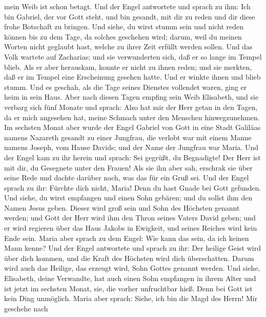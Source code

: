 mein Weib ist schon betagt.  Und der Engel antwortete und
sprach zu ihm: Ich bin Gabriel, der vor Gott steht, und bin gesandt, mit
dir zu reden und dir diese frohe Botschaft zu bringen. 
Und siehe, du wirst stumm sein und nicht reden können bis zu dem Tage,
da solches geschehen wird; darum, weil du meinen Worten nicht geglaubt
hast, welche zu ihrer Zeit erfüllt werden sollen.  Und
das Volk wartete auf Zacharias; und sie verwunderten sich, daß er so
lange im Tempel blieb.  Als er aber herauskam, konnte er
nicht zu ihnen reden; und sie merkten, daß er im Tempel eine Erscheinung
gesehen hatte. Und er winkte ihnen und blieb stumm.  Und
es geschah, als die Tage seines Dienstes vollendet waren, ging er heim
in sein Haus.  Aber nach diesen Tagen empfing sein Weib
Elisabeth, und sie verbarg sich fünf Monate und sprach: 
Also hat mir der Herr getan in den Tagen, da er mich angesehen hat,
meine Schmach unter den Menschen hinwegzunehmen.  Im
sechsten Monat aber wurde der Engel Gabriel von Gott in eine Stadt
Galiläas namens Nazareth gesandt  zu einer Jungfrau, die
verlobt war mit einem Manne namens Joseph, vom Hause Davids; und der
Name der Jungfrau war Maria.  Und der Engel kam zu ihr
herein und sprach: Sei gegrüßt, du Begnadigte! Der Herr ist mit dir, du
Gesegnete unter den Frauen!  Als sie ihn aber sah,
erschrak sie über seine Rede und dachte darüber nach, was das für ein
Gruß sei.  Und der Engel sprach zu ihr: Fürchte dich
nicht, Maria! Denn du hast Gnade bei Gott gefunden.  Und
siehe, du wirst empfangen und einen Sohn gebären; und du sollst ihm den
Namen Jesus geben.  Dieser wird groß sein und Sohn des
Höchsten genannt werden; und Gott der Herr wird ihm den Thron seines
Vaters David geben;  und er wird regieren über das Haus
Jakobs in Ewigkeit, und seines Reiches wird kein Ende sein.
 Maria aber sprach zu dem Engel: Wie kann das sein, da
ich keinen Mann kenne?  Und der Engel antwortete und
sprach zu ihr: Der heilige Geist wird über dich kommen, und die Kraft
des Höchsten wird dich überschatten. Darum wird auch das Heilige, das
erzeugt wird, Sohn Gottes genannt werden.  Und siehe,
Elisabeth, deine Verwandte, hat auch einen Sohn empfangen in ihrem Alter
und ist jetzt im sechsten Monat, sie, die vorher unfruchtbar hieß.
 Denn bei Gott ist kein Ding unmöglich. 
Maria aber sprach: Siehe, ich bin die Magd des Herrn! Mir geschehe nach
